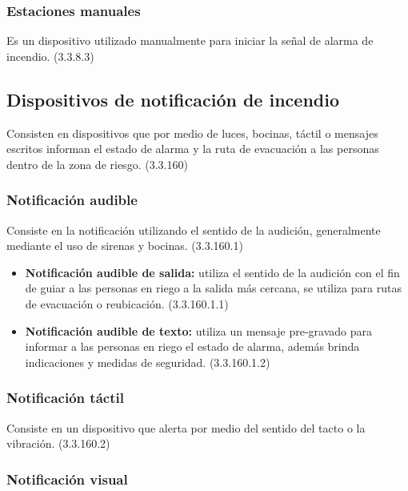 \subsubsection{Estaciones manuales}

Es un dispositivo utilizado manualmente para iniciar la señal de alarma de incendio. (3.3.8.3)



\subsection{Dispositivos de notificación de incendio}

Consisten en dispositivos que por medio de luces, bocinas, táctil o mensajes escritos informan el estado de alarma y la ruta de evacuación a las personas dentro de la zona de riesgo. (3.3.160)\cite{NFPA72}

\subsubsection{Notificación audible}

Consiste en la notificación utilizando el sentido de la audición, generalmente mediante el uso de sirenas y  bocinas. (3.3.160.1)


\begin{itemize}
	
	\item \textbf{Notificación audible de salida:} utiliza el sentido de la audición con el fin de guiar a las personas en riego a la salida más cercana, se utiliza para rutas de evacuación o reubicación. (3.3.160.1.1)
	
	\item \textbf{Notificación audible de texto:} utiliza un mensaje pre-gravado para informar a las personas en riego el estado de alarma, además brinda indicaciones y medidas de seguridad. (3.3.160.1.2)
		
\end{itemize}


\subsubsection{Notificación táctil}

Consiste en un dispositivo que alerta por medio del sentido del tacto o la vibración. (3.3.160.2)

\subsubsection{Notificación visual}

